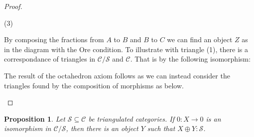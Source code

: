 \documentclass[11pt]{article}
\newtheorem{prop}[theorem]{Proposition}
\theoremstyle{definition}
\theoremstyle{remark}
\begin{document}
\begin{proof}
\begin{center}
                    (3)
                \end{center}
                By composing the fractions from $A$ to $B$ and $B$ to $C$ we can find an object $Z$ as in the diagram with the Ore condition. To illustrate with triangle (1), there is a correspondance of triangles in $\mathcal{C}/\mathcal{S}$ and $\mathcal{C}$. That is by the following isomorphism:
                \begin{center}
                \end{center}
                The result of the octahedron axiom follows as we can instead consider the triangles found by the composition of morphisms as below.
                \begin{center}
                \end{center}
            \end{proof}

            \begin{prop}
                Let $\mathcal{S}\subseteq\mathcal{C}$ be triangulated categories. If $0:X\rightarrow 0$ is an isomorphism in $\mathcal{C}/\mathcal{S}$, then there is an object $Y$ such that $X\oplus Y:\mathcal{S}$.
            \end{prop}
\end{document}
